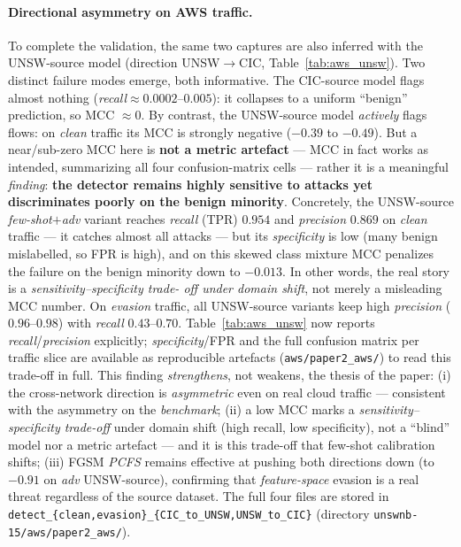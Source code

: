 \documentclass[preprint,12pt,authoryear]{elsarticle}
\begin{document}
\paragraph{Directional asymmetry on AWS traffic.} To complete the validation, the
same two captures are also inferred with the UNSW-source model (direction
UNSW$\rightarrow$CIC, Table~\ref{tab:aws_unsw}). Two distinct failure modes emerge,
both informative. The CIC-source model flags almost nothing
(\emph{recall}$\approx 0.0002$--$0.005$): it collapses to a uniform ``benign''
prediction, so MCC $\approx 0$. By contrast, the UNSW-source model \emph{actively}
flags flows: on \emph{clean} traffic its MCC is strongly negative ($-0.39$ to
$-0.49$). But a near/sub-zero MCC here is \textbf{not a metric artefact} --- MCC in
fact works as intended, summarizing all four confusion-matrix cells --- rather it is
a meaningful \emph{finding}: \textbf{the detector remains highly sensitive to attacks
yet discriminates poorly on the benign minority}. Concretely, the UNSW-source
\emph{few-shot$+$adv} variant reaches \emph{recall} (TPR) $0.954$ and
\emph{precision} $0.869$ on \emph{clean} traffic --- it catches almost all attacks ---
but its \emph{specificity} is low (many benign mislabelled, so FPR is high), and on
this skewed class mixture MCC penalizes the failure on the benign minority down to
$-0.013$. In other words, the real story is a \emph{sensitivity--specificity trade-
off under domain shift}, not merely a misleading MCC number. On \emph{evasion}
traffic, all UNSW-source variants keep high \emph{precision} ($0.96$--$0.98$) with
\emph{recall} $0.43$--$0.70$. Table~\ref{tab:aws_unsw} now reports
\emph{recall}/\emph{precision} explicitly; \emph{specificity}/FPR and the full
confusion matrix per traffic slice are available as reproducible artefacts
(\texttt{aws/paper2\_aws/}) to read this trade-off in full. This finding
\emph{strengthens}, not weakens, the thesis of the paper: (i) the cross-network
direction is \emph{asymmetric} even on real cloud traffic --- consistent with the
asymmetry on the \emph{benchmark}; (ii) a low MCC marks a \emph{sensitivity--
specificity trade-off} under domain shift (high recall, low specificity), not a
``blind'' model nor a metric artefact --- and it is this trade-off that few-shot
calibration shifts; (iii) FGSM \emph{PCFS} remains effective at pushing both
directions down (to $-0.91$ on \emph{adv} UNSW-source), confirming that
\emph{feature-space} evasion is a real threat regardless of the source dataset. The
full four files are stored in
\texttt{detect\_\{clean,evasion\}\_\{CIC\_to\_UNSW,UNSW\_to\_CIC\}} (directory
\texttt{unswnb-15/aws/paper2\_aws/}).
\end{document}
